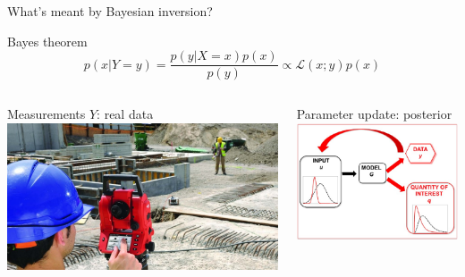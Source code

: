 \documentclass[dvipsnames]{beamer}
\begin{document}
	\begin{frame}{What's meant by Bayesian inversion?}
	\begin{block}{Bayes theorem}
	\[ p(x| Y = y) = \frac{p(y | X = x) p(x)}{p(y)} \propto \mathcal{L}(x; y) p(x)\]
	\end{block}
	\begin{columns}
	\begin{column}{.5\textwidth}
	\begin{block}{Measurements $Y$: real data}
	\includegraphics[width=\textwidth]{images/1111measure.jpg}
	\end{block}
	\end{column}
	\begin{column}{.5\textwidth}
	\begin{block}{Parameter update: posterior}
	\includegraphics[width=\textwidth]{images/bayes_inv.png}
	\end{block}
	\end{column}
	\end{columns}
	\end{frame}
	
\end{document}
